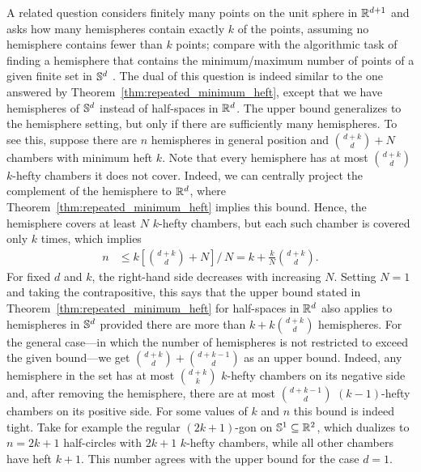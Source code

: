\documentclass[a4paper,UKenglish,cleveref, autoref,numberwithinsect]{socg-lipics-v2021}
\newcommand {\mm}[1] {\ifmmode{#1}\else{\mbox{\(#1\)}}\fi}
\theoremstyle{plain}
\newcommand{\Rspace}        {\mm{{\mathbb R}}}
\newcommand{\Sspace}        {\mm{{\mathbb S}}}
\begin{document}
\begin{remark}\label{rem:repeated_minimum_heft_sphere}
  A related question considers finitely many points on the unit sphere in $\Rspace^{d+1}$ and asks how many hemispheres contain exactly $k$ of the points, assuming no hemisphere contains fewer than $k$ points; compare with the algorithmic task of finding a hemisphere that contains the minimum/maximum number of points of a given finite set in $\Sspace^d$ \cite{JP78}.
  The dual of this question is indeed similar to the one answered by Theorem~\ref{thm:repeated_minimum_heft}, except that we have hemispheres of $\Sspace^d$ instead of half-spaces in $\Rspace^d$.
  \smallskip
  The upper bound generalizes to the hemisphere setting, but only if there are sufficiently many hemispheres.
  To see this, suppose there are $n$ hemispheres in general position and $\binom{d+k}{d} + N$ chambers with minimum heft $k$.
  Note that every hemisphere has at most $\binom{d+k}{d}$ $k$-hefty chambers it does not cover.
  Indeed, we can centrally project the complement of the hemisphere to $\Rspace^d$, where Theorem~\ref{thm:repeated_minimum_heft} implies this bound.
  Hence, the hemisphere covers at least $N$ $k$-hefty chambers, but each such chamber is covered only $k$ times, which implies
  \begin{align}
    n &\leq k \left[ \binom{d+k}{d} + N \right] / \,N = k + \frac{k}{N} \binom{d+k}{d} .
  \end{align}
  For fixed $d$ and $k$, the right-hand side decreases with increasing $N$.
  Setting $N = 1$ and taking the contrapositive, this says that the upper bound stated in Theorem~\ref{thm:repeated_minimum_heft} for half-spaces in $\Rspace^d$ also applies to hemispheres in $\Sspace^d$ provided there are more than $k + k \binom{d+k}{d}$ hemispheres.
  \smallskip
  For the general case---in which the number of hemispheres is not restricted to exceed the given bound---we get $\binom{d+k}{d} + \binom{d+k-1}{d}$ as an upper bound.
  Indeed, any hemisphere in the set has at most $\binom{d+k}{k}$ $k$-hefty chambers on its negative side and, after removing the hemisphere, there are at most $\binom{d+k-1}{d}$ $(k-1)$-hefty chambers on its positive side.
  For some values of $k$ and $n$ this bound is indeed tight.
  Take for example the regular $(2k+1)$-gon on $\Sspace^1 \subseteq \Rspace^2$, which dualizes to $n = 2k+1$ half-circles with $2k+1$ $k$-hefty chambers,
  while all other chambers have heft $k+1$.
  This number agrees with the upper bound for the case $d=1$.
  

\end{remark}
\end{document}
